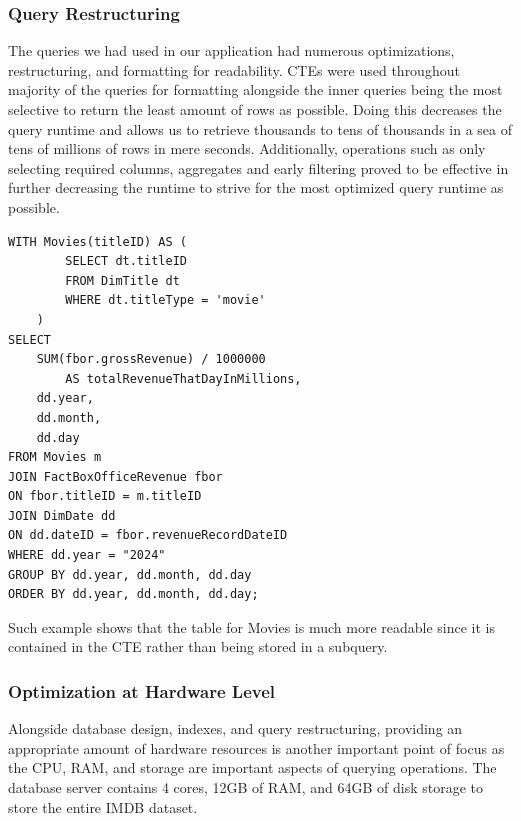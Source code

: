 \subsubsection{Query Restructuring}

The queries we had used in our application had numerous optimizations, restructuring, and formatting for readability. CTEs were used throughout majority of the queries for formatting alongside the inner queries being the most selective to return the least amount of rows as possible. Doing this decreases the query runtime and allows us to retrieve thousands to tens of thousands in a sea of tens of millions of rows in mere seconds. Additionally, operations such as only selecting required columns, aggregates and early filtering proved to be effective in further decreasing the runtime to strive for the most optimized query runtime as possible.

\begin{lstlisting}
WITH Movies(titleID) AS ( 
        SELECT dt.titleID
        FROM DimTitle dt
        WHERE dt.titleType = 'movie'
    )
SELECT 
    SUM(fbor.grossRevenue) / 1000000 
        AS totalRevenueThatDayInMillions, 
    dd.year, 
    dd.month, 
    dd.day
FROM Movies m
JOIN FactBoxOfficeRevenue fbor 
ON fbor.titleID = m.titleID
JOIN DimDate dd 
ON dd.dateID = fbor.revenueRecordDateID
WHERE dd.year = "2024"
GROUP BY dd.year, dd.month, dd.day
ORDER BY dd.year, dd.month, dd.day;
\end{lstlisting}

Such example shows that the table for Movies is much more readable since it is contained in the CTE rather than being  stored in a subquery.

\subsubsection{Optimization at Hardware Level}

Alongside database design, indexes, and query restructuring, providing an appropriate amount of hardware resources is another important point of focus as the CPU, RAM, and storage are important aspects of querying operations. The database server contains 4 cores, 12GB of RAM, and 64GB of disk storage to store the entire IMDB dataset.